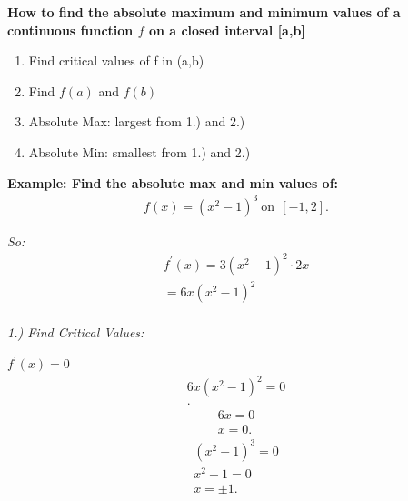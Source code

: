 \documentclass{report}
\begin{document}
    \pagebreak \bigbreak \noindent
    \begin{large}
      \begin{center}
        \textbf{How to find the absolute maximum and minimum values of a continuous function $f$ on a closed interval [a,b]}
      \end{center}
    \end{large}

    \bigbreak \noindent 
    \begin{enumerate}
      \item Find critical values of f in (a,b)
      \item Find $f(a)$ and $f(b)$
      \item Absolute Max: largest from 1.) and 2.) 
      \item Absolute Min: smallest from 1.) and 2.)
    \end{enumerate}

    \bigbreak \noindent 
    \begin{mdframed}
      \textbf{Example: Find the absolute max and min values of:}
      \begin{align*}
        f(x) = (x^{2} - 1)^{3}\ \text{on}\ \ [-1,2]
      .\end{align*}
    \end{mdframed}

    \bigbreak \noindent
    \textit{So:}
    \begin{align*}
      f^{\prime}(x) = 3(x^{2} -1)^{2} \cdot 2x \\
      = 6x(x^{2} -1)^{2}\\
    \end{align*}

    \bigbreak \noindent 
    \textit{1.) Find Critical Values:}

    \bigbreak \noindent 
    \textbf{\textit{\underline{$f^{\prime}(x) = 0$}}}
    \begin{align*}
      6x(x^{2} -1)^{2} = 0 \\
    .\end{align*}
    \begin{align*}
      6x = 0 \\
      x = 0
    .\end{align*}
    \begin{align*}
      (x^{2} -1)^{3} = 0 \\
      x^{2} - 1 = 0  \\
      x = \pm 1
    .\end{align*}
\end{document}
